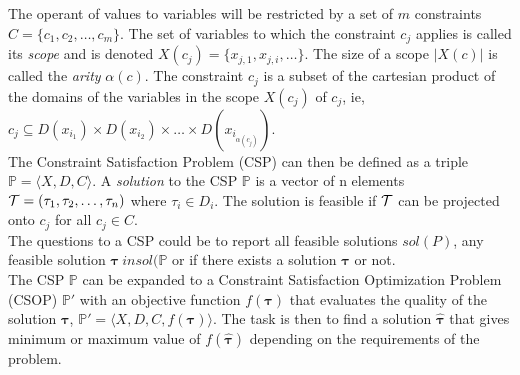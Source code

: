 The operant of values to variables will be restricted by a set of $m$ constraints $C= \{ 
c_1,c_2, \dots , c_m \} $. The set of variables to which the constraint $c_j$   applies is 
called its \emph{scope} and 
is denoted $X(c_j) = \{x_{j,1}, x_{j,i} , \dots \}$. The size of a scope $|X(c)|$ is called the 
\emph{arity} $\alpha(c)$. The constraint $c_j$ is a subset of the cartesian product of the domains of the variables in 
the scope $X(c_j)$ of $c_j$, ie, $c_j \subseteq D(x_{i_1}) \times D(x_{i_2}) \times \dots \times 
D(x_{i_{\alpha(c_j)}})$. \\
The Constraint Satisfaction Problem (CSP) can then be defined as a triple $\mathbb{P} = \langle X,D,C \rangle$. A 
\emph{solution} to the CSP $\mathbb{P}$ is a vector of n elements $\mathcal{T} = (\tau_1,\tau_2,\dots,\tau_n) $ 
where $\tau_i 
\in D_i$. The solution is feasible if $\mathcal{T}$ can be projected  onto $c_j$ for all $c_j \in C$. 
\\ 
The questions to a CSP could be to report all feasible solutions $sol(P)$, any feasible solution $\mathbf{\tau}\ in 
sol(\mathbb{P}$ or if there 
exists a solution $\mathbf{\tau}$ or not. \\
The CSP $\mathbb{P}$ can be expanded to a Constraint Satisfaction Optimization Problem (CSOP) $\mathbb{P'}$ 
with an objective function $f(\mathbf{\tau})$ that evaluates the quality of the solution $\mathbf{\tau}$, $\mathbb{P'} 
= \langle 
X,D,C,f(\mathbf{\tau}) \rangle$. The task is then to find a 
solution $\hat{\mathbf{\tau}}$ that gives minimum or maximum value of $f(\hat{\mathbf{\tau}})$ depending on the 
requirements of the 
problem. 
\iffalse
